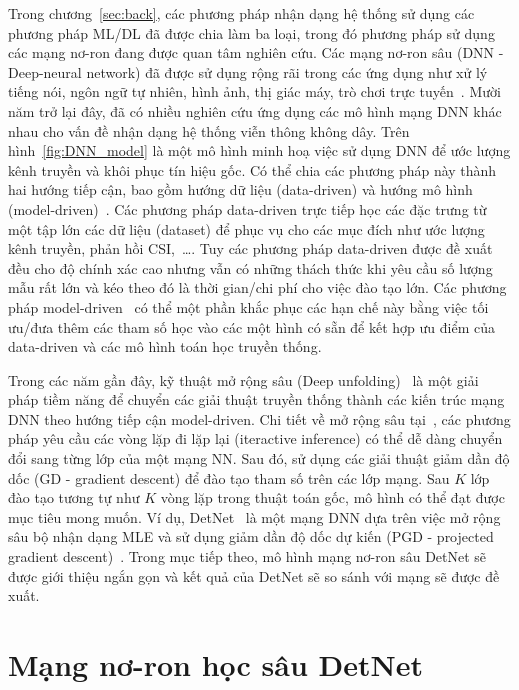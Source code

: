 Trong chương~\ref{sec:back}, các phương pháp nhận dạng hệ thống sử dụng các phương pháp ML/DL đã được chia làm ba loại, trong đó phương pháp sử dụng các mạng nơ-ron đang được quan tâm nghiên cứu. Các mạng nơ-ron sâu (DNN - Deep-neural network) đã được sử dụng rộng rãi trong các ứng dụng như xử lý tiếng nói, ngôn ngữ tự nhiên, hình ảnh, thị giác máy, trò chơi trực tuyến~\cite{Samek2021}. Mười năm trở lại đây, đã có nhiều nghiên cứu ứng dụng các mô hình mạng DNN khác nhau cho vấn đề nhận dạng hệ thống viễn thông không dây. Trên hình~\ref{fig:DNN_model} là một mô hình minh hoạ việc sử dụng DNN để ước lượng kênh truyền và khôi phục tín hiệu gốc. Có thể chia các phương pháp này thành hai hướng tiếp cận, bao gồm hướng dữ liệu (data-driven) và hướng mô hình (model-driven)~\cite{Liao2020}. Các phương pháp data-driven trực tiếp học các đặc trưng từ một tập lớn các dữ liệu (dataset) để phục vụ cho các mục đích như ước lượng kênh truyền, phản hồi CSI,~\ldots. Tuy các phương pháp data-driven được đề xuất đều cho độ chính xác cao nhưng vẫn có những thách thức khi yêu cầu số lượng mẫu rất lớn và kéo theo đó là thời gian/chi phí cho việc đào tạo lớn. Các phương pháp model-driven~\cite{He2019} có thể một phần khắc phục các hạn chế này bằng việc tối ưu/đưa thêm các tham số học vào các một hình có sẵn để kết hợp ưu điểm của data-driven và các mô hình toán học truyền thống. 

Trong các năm gần đây, kỹ thuật mở rộng sâu (Deep unfolding)~\cite{Wisdom2016} là một giải pháp tiềm năng để chuyển các giải thuật truyền thống thành các kiến trúc mạng DNN theo hướng tiếp cận model-driven. Chi tiết về mở rộng sâu tại~\cite{John2014}, các phương pháp yêu cầu các vòng lặp đi lặp lại (iteractive inference) có thể dễ dàng chuyển đổi sang từng lớp của một mạng NN. Sau đó, sử dụng các giải thuật giảm dần độ dốc (GD - gradient descent) để đào tạo tham số trên các lớp mạng. Sau $K$ lớp đào tạo tương tự như $K$ vòng lặp trong thuật toán gốc, mô hình có thể đạt được mục tiêu mong muốn. Ví dụ, DetNet~\cite{Samuel2017} là một mạng DNN dựa trên việc mở rộng sâu bộ nhận dạng MLE và sử dụng giảm dần độ dốc dự kiến (PGD - projected gradient descent)~\cite{Chen2015}. Trong mục tiếp theo, mô hình mạng nơ-ron sâu DetNet sẽ được giới thiệu ngắn gọn và kết quả của DetNet sẽ so sánh với mạng sẽ được đề xuất.

\section{Mạng nơ-ron học sâu DetNet}

